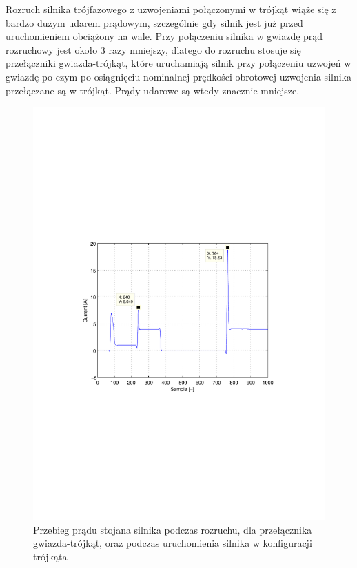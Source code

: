 \documentclass[12pt]{article}
\begin{document}
Rozruch silnika trójfazowego z uzwojeniami połączonymi w trójkąt wiąże się z
bardzo dużym udarem prądowym, szczególnie gdy silnik jest już przed
uruchomieniem obciążony na wale. Przy połączeniu silnika w gwiazdę prąd
rozruchowy jest około 3 razy mniejszy, dlatego do rozruchu stosuje się
przełączniki gwiazda-trójkąt, które uruchamiają silnik przy połączeniu uzwojeń w
gwiazdę po czym po osiągnięciu nominalnej prędkości obrotowej uzwojenia silnika
przełączane są w trójkąt. Prądy udarowe są wtedy znacznie mniejsze.

\begin{figure}[!htb]
	\begin{center}
		\includegraphics[trim=5cm 9cm 5cm 9cm]{../res/img/Ir.pdf}  
	\end{center}
	\caption{Przebieg prądu stojana silnika podczas rozruchu, dla przełącznika
	gwiazda-trójkąt, oraz podczas uruchomienia silnika w konfiguracji trójkąta}
\end{figure}
\end{document}
